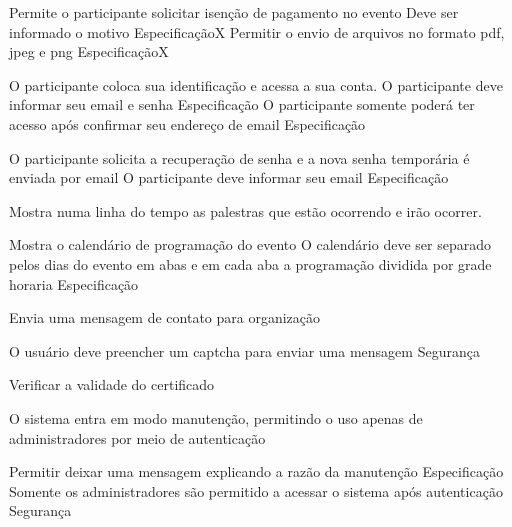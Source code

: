 \documentclass[12pt,a4paper]{article}
\begin{document}
				{Permite o participante solicitar isenção de pagamento no evento}
				{%
					  {Deve ser informado o motivo}
					  {Especificação}{}{X}%
					  {Permitir o envio de arquivos no formato pdf, jpeg e png}
					  {Especificação}{}{X}%
				}
				
				{O participante coloca sua identificação e acessa a sua conta.}
				{%
					  {O participante deve informar seu email e senha}
					  {Especificação}{}{}%
					  {O participante somente poderá ter acesso após confirmar seu endereço de email}
					  {Especificação}{}{}%
				}
				
										
				{O participante solicita a recuperação de senha e a nova senha temporária é enviada por email}
				{%
					  {O participante deve informar seu email}
					  {Especificação}{}{}%
				}
				
				{Mostra numa linha do tempo as palestras que estão ocorrendo e irão ocorrer.}
				{%
				
				}
				
				{Mostra o calendário de programação do evento}
				{%
					  {O calendário deve ser separado pelos dias do evento em abas e em cada aba a programação dividida por grade horaria}
					  {Especificação}{}{}%
				}
				
				{Envia uma mensagem de contato para organização}
				{%
					  {O usuário deve preencher um captcha para enviar uma mensagem}
					  {Segurança}{}{}%
				
				}
				
				{Verificar a validade do certificado}
				{%
				
				}
				
				{O sistema entra em modo manutenção, permitindo o uso apenas de administradores por meio de autenticação}
				{%
						  {Permitir deixar uma mensagem explicando a razão da manutenção}
						  {Especificação}{}{}%
						  {Somente os administradores são permitido a acessar o sistema após autenticação}
						  {Segurança}{}{}%
				
				}
			
\end{document}

